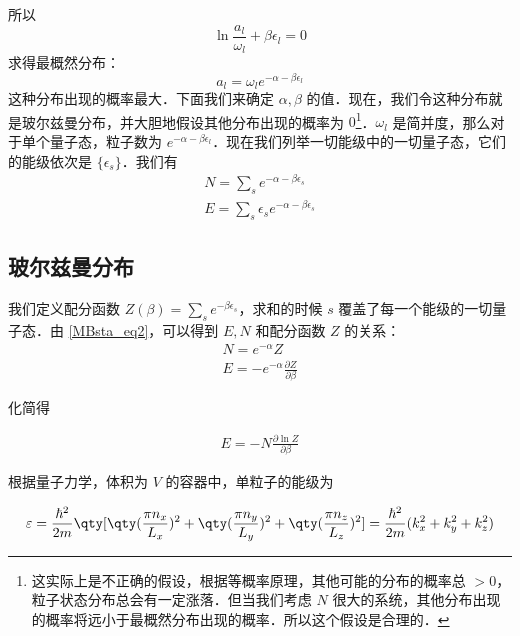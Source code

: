 所以
\begin{equation}
\ln \frac{a_l}{\omega_l}+\beta\epsilon_l = 0
\end{equation}
求得最概然分布：
\begin{equation}
a_l=\omega_l e^{-\alpha -\beta \epsilon_l}
\end{equation}
这种分布出现的概率最大．下面我们来确定 $\alpha,\beta$ 的值．现在，我们令这种分布就是玻尔兹曼分布，并大胆地假设其他分布出现的概率为 $0$\footnote{这实际上是不正确的假设，根据等概率原理，其他可能的分布的概率总 $>0$，粒子状态分布总会有一定涨落．但当我们考虑 $N$ 很大的系统，其他分布出现的概率将远小于最概然分布出现的概率．所以这个假设是合理的．}．$\omega_l$ 是简并度，那么对于单个量子态，粒子数为 $e^{-\alpha-\beta \epsilon_l}$．现在我们列举一切能级中的一切量子态，它们的能级依次是 $\{\epsilon_s\}$．我们有
\begin{equation}\label{MBsta_eq2}
\begin{aligned}
N=\sum_s e^{-\alpha-\beta \epsilon_s}\\
E=\sum_s \epsilon_s e^{-\alpha-\beta \epsilon_s}
\end{aligned}
\end{equation}
\subsection{玻尔兹曼分布}
我们定义配分函数 $Z(\beta)=\sum_s e^{-\beta \epsilon_s}$，求和的时候 $s$ 覆盖了每一个能级的一切量子态．由 \autoref{MBsta_eq2}，可以得到 $E,N$ 和配分函数 $Z$ 的关系：
\begin{equation}\label{MBsta_eq3}
\begin{aligned}
N=e^{-\alpha}Z\\
E=-e^{-\alpha}\frac{\partial Z}{\partial \beta}
\end{aligned}
\end{equation}

化简得

\begin{equation}\label{MBsta_eq4}
\begin{aligned}
E=-N\frac{\partial \ln Z}{\partial \beta}
\end{aligned}
\end{equation}

根据量子力学，体积为 $V$ 的容器中，单粒子的能级为

\begin{equation}
\varepsilon = \frac{\hbar ^2}{2m} \qty[\qty(\frac{\pi n_x}{L_x})^2 + \qty(\frac{\pi n_y}{L_y})^2 + \qty(\frac{\pi n_z}{L_z})^2] = \frac{\hbar ^2}{2m} (k_x^2 + k_y^2 + k_z^2)
\end{equation}

